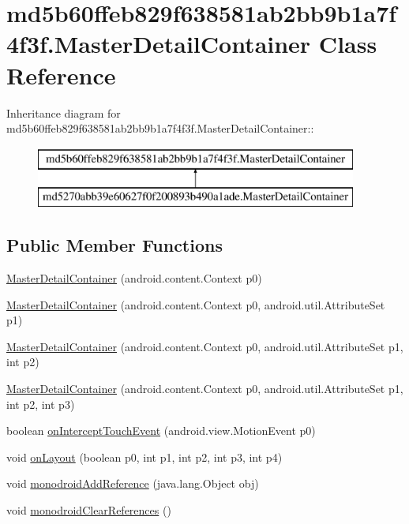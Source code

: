 \hypertarget{classmd5b60ffeb829f638581ab2bb9b1a7f4f3f_1_1_master_detail_container}{
\section{md5b60ffeb829f638581ab2bb9b1a7f4f3f.MasterDetailContainer Class Reference}
\label{classmd5b60ffeb829f638581ab2bb9b1a7f4f3f_1_1_master_detail_container}
}
Inheritance diagram for md5b60ffeb829f638581ab2bb9b1a7f4f3f.MasterDetailContainer::\begin{figure}[H]
\begin{center}
\leavevmode
\includegraphics[height=2cm]{classmd5b60ffeb829f638581ab2bb9b1a7f4f3f_1_1_master_detail_container}
\end{center}
\end{figure}
\subsection*{Public Member Functions}
\begin{CompactItemize}
\item 
\hyperlink{classmd5b60ffeb829f638581ab2bb9b1a7f4f3f_1_1_master_detail_container_1af6b6d44bea0fd2817369e2e442b274}{MasterDetailContainer} (android.content.Context p0)
\item 
\hyperlink{classmd5b60ffeb829f638581ab2bb9b1a7f4f3f_1_1_master_detail_container_c9b0445081c2aabb67adc98d6b8c9ca1}{MasterDetailContainer} (android.content.Context p0, android.util.AttributeSet p1)
\item 
\hyperlink{classmd5b60ffeb829f638581ab2bb9b1a7f4f3f_1_1_master_detail_container_3e752c4a1c463a622ff8574921b3c763}{MasterDetailContainer} (android.content.Context p0, android.util.AttributeSet p1, int p2)
\item 
\hyperlink{classmd5b60ffeb829f638581ab2bb9b1a7f4f3f_1_1_master_detail_container_02e06b2d64b99adfc10ba2adc27242c9}{MasterDetailContainer} (android.content.Context p0, android.util.AttributeSet p1, int p2, int p3)
\item 
boolean \hyperlink{classmd5b60ffeb829f638581ab2bb9b1a7f4f3f_1_1_master_detail_container_e96ebc11fc79fa8ff77d7106dac3971a}{onInterceptTouchEvent} (android.view.MotionEvent p0)
\item 
void \hyperlink{classmd5b60ffeb829f638581ab2bb9b1a7f4f3f_1_1_master_detail_container_0ef2e1e3ab4836b6a210d6af09d780c6}{onLayout} (boolean p0, int p1, int p2, int p3, int p4)
\item 
void \hyperlink{classmd5b60ffeb829f638581ab2bb9b1a7f4f3f_1_1_master_detail_container_5f8aaba34799a0323fa0d77618dfae96}{monodroidAddReference} (java.lang.Object obj)
\item 
void \hyperlink{classmd5b60ffeb829f638581ab2bb9b1a7f4f3f_1_1_master_detail_container_4bbf2f5847044e80a0b1b8e54eb8f621}{monodroidClearReferences} ()
\end{CompactItemize}
